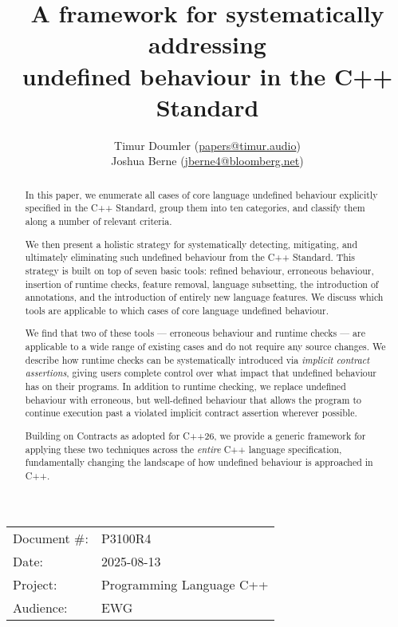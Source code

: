 

\title{A framework for systematically addressing \\ undefined behaviour in the C++ Standard} 
\author{ Timur Doumler \small(\href{mailto:papers@timur.audio}{papers@timur.audio}) 
\\ Joshua Berne \small(\href{mailto:jberne4@bloomberg.net}{jberne4@bloomberg.net})  
}
\date{}
\maketitle

\begin{tabular}{ll}
Document \#: & P3100R4 \\
Date: &2025-08-13 \\
Project: & Programming Language C++ \\
Audience: & EWG
\end{tabular}

\begin{abstract}
In this paper, we enumerate all cases of core language undefined behaviour explicitly specified in the C++ Standard,  group them into ten categories, and classify them along a number of relevant criteria.

We then present a holistic strategy for systematically detecting, mitigating, and ultimately eliminating such undefined behaviour from the C++ Standard. This strategy is built on top of seven basic tools: refined behaviour, erroneous behaviour, insertion of runtime checks, feature removal, language subsetting, the introduction of annotations, and the introduction of entirely new language features. We discuss which tools are applicable to which cases of core language undefined behaviour.

We find that two of these tools --- erroneous behaviour and runtime checks --- are applicable to a wide range of existing cases and do not require any source changes. We describe how runtime
checks can be systematically introduced via \emph{implicit contract assertions}, giving users complete
control over what impact that undefined behaviour has on their programs. In addition to runtime
checking, we replace undefined behaviour with erroneous, but well-defined behaviour that allows the program to continue execution past a violated implicit contract assertion wherever possible.

Building on Contracts as adopted for C++26, we provide a generic framework for applying these two techniques across the \emph{entire} C++ language specification, fundamentally changing the landscape of how undefined behaviour is approached in C++.
\end{abstract}

